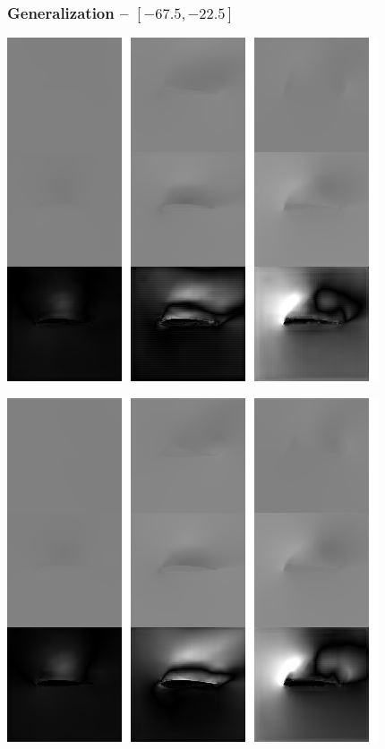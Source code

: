 \begin{frame}
    \frametitle{Generalization -- $[-67.5, -22.5]$}
    \vspace*{.1cm}
\begin{multicols}{2}
	
	\includegraphics[width=.9\columnwidth, height=.6\textheight]{./Ressourcen/Praesentation/Bilder/TransferEval/left/0064_bw.png}%
    \vfill\columnbreak
    
    \includegraphics[width=.9\columnwidth, height=.6\textheight]{./Ressourcen/Praesentation/Bilder/TransferEval/left/0074_bw.png}%
\end{multicols}
    
\end{frame}
\clearpage

